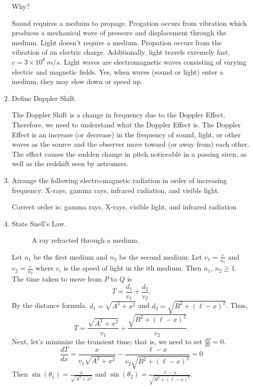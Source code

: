 \begin{enumerate}
  Why?
  \par\smallskip
  Sound requires a meduim to propage.
  Progation occurs from vibration which produces a mechanical wave of pressure
  and displacement through the medium.
  Light doesn't require a medium.
  Propation occurs from the vibration of an electric charge.
  Additionally, light travels exremely fast, \(c = 3\times 10^8 \ m/s\).
  Light waves are electromagnetic waves consisting of varying electric and
  magnetic fields.
  Yes, when waves (sound or light) enter a medium, they may slow down or speed
  up.
\item
  Define Doppler Shift.
  \par\smallskip
  The Doppler Shift is a change in frequency due to the Doppler Effect.
  Therefore, we need to understand what the Doppler Effect is.
  The Doppler Effect is an increase (or decrease) in the frequency of sound,
  light, or other waves as the source and the observer move toward (or away
  from) each other.
  The effect causes the sudden change in pitch noticeable in a passing siren,
  as well as the redshift seen by astromers.
\item
  Arrange the following electro-magnetic radiation in order of increasing
  frequency: X-rays, gamma rays, infrared radiation, and visible light.
  \par\smallskip
  Correct order is: gamma rays, X-rays, visible light, and infrared radiation
\item
  State Snell's Law.
  \begin{figure}[H]
    \centering
    
    \caption{A ray refracted through a medium.}
  \end{figure}
  Let \(n_1\) be the first medium and \(n_2\) be the second medium.
  Let \(v_1 = \frac{c}{n_1}\) and \(v_2 = \frac{c}{n_2}\) where \(v_i\) is the
  speed of light in the ith medium.
  Then \(n_1\), \(n_2\geq 1\).
  The time taken to move from \(P\) to \(Q\) is
  \[
  T = \frac{d_1}{v_1} + \frac{d_2}{v_2}.
  \]
  By the distance formula, \(d_1 = \sqrt{A^2 + x^2}\) and
  \(d_2 = \sqrt{B^2 + (\ell - x)^2}\).
  Thus,
  \[
  T = \frac{\sqrt{A^2 + x^2}}{v_1} + \frac{\sqrt{B^2 + (\ell - x)^2}}{v_2}.
  \]
  Next, let's minimize the transient time; that is, we need to set
  \(\frac{dT}{dx} = 0\).
  \[
  \frac{dT}{dx} = \frac{x}{v_1\sqrt{A^2 + x^2}} -
  \frac{\ell - x}{v_2\sqrt{B^2 + (\ell - x)^2}} = 0
  \]
  Then \(\sin(\theta_1) = \frac{x}{\sqrt{A^2 + x^2}}\) and
  \(\sin(\theta_2) = \frac{\ell - x}{\sqrt{B^2 + (\ell - x)^2}}\).

\end{enumerate}
